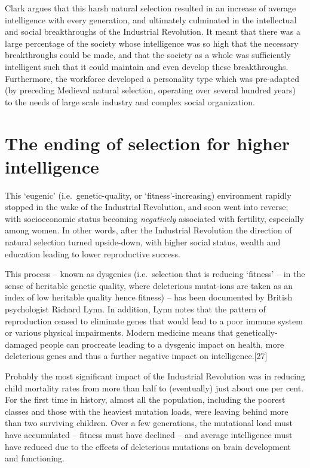 \documentclass[
]{book}
\begin{document}
Clark argues that this harsh natural selection resulted in an increase of average intelligence with every generation, and ultimately culminated in the intellectual and social breakthroughs of the Industrial Revolution. It meant that there was a large percentage of the society whose intelligence was so high that the necessary breakthroughs could be made, and that the society as a whole was sufficiently intelligent such that it could maintain and even develop these breakthroughs. Furthermore, the workforce developed a personality type which was pre-adapted (by preceding Medieval natural selection, operating over several hundred years) to the needs of large scale industry and complex social organization.

\hypertarget{the-ending-of-selection-for-higher-intelligence}{%
\section{The ending of selection for higher intelligence}\label{the-ending-of-selection-for-higher-intelligence}}

This `eugenic' (i.e.~genetic-quality, or `fitness'-increasing) environment rapidly stopped in the wake of the Industrial Revolution, and soon went into reverse; with socioeconomic status becoming \emph{negatively} associated with fertility, especially among women. In other words, after the Industrial Revolution the direction of natural selection turned upside-down, with higher social status, wealth and education leading to lower reproductive success.

This process -- known as dysgenics (i.e.~selection that is reducing `fitness' -- in the sense of heritable genetic quality, where deleterious mutat-ions are taken as an index of low heritable quality hence fitness) -- has been documented by British psychologist Richard Lynn. In addition, Lynn notes that the pattern of reproduction ceased to eliminate genes that would lead to a poor immune system or various physical impairments. Modern medicine means that genetically-damaged people can procreate leading to a dysgenic impact on health, more deleterious genes and thus a further negative impact on intelligence.{[}27{]}

Probably the most significant impact of the Industrial Revolution was in reducing child mortality rates from more than half to (eventually) just about one per cent. For the first time in history, almost all the population, including the poorest classes and those with the heaviest mutation loads, were leaving behind more than two surviving children. Over a few generations, the mutational load must have accumulated -- fitness must have declined -- and average intelligence must have reduced due to the effects of deleterious mutations on brain development and functioning.
\end{document}
